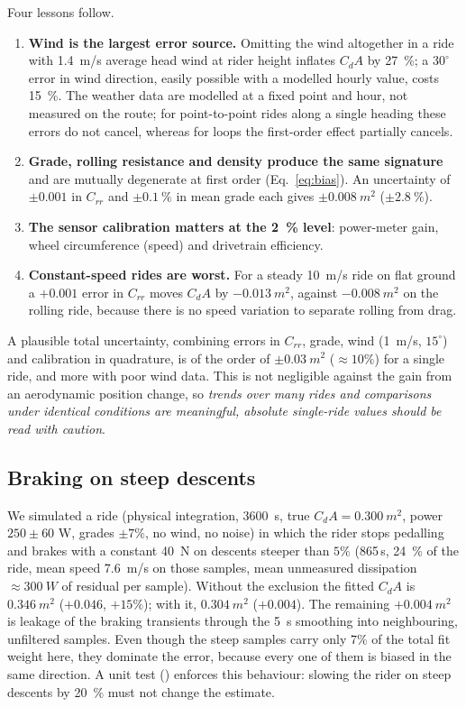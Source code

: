 \documentclass[11pt,a4paper]{article}
\newcommand{\code}[1]{\texttt{\detokenize{#1}}}
\newcommand{\CdA}{C_{\!d}A}
\begin{document}
Four lessons follow.
\begin{enumerate}
 \item \textbf{Wind is the largest error source.} Omitting the wind altogether in a ride with \SI{1.4}{m/s} average head wind at rider height inflates \(\CdA\) by \SI{27}{\percent}; a \(30^\circ\) error in wind direction, easily possible with a modelled hourly value, costs \SI{15}{\percent}. The weather data are modelled at a fixed point and hour, not measured on the route; for point-to-point rides along a single heading these errors do not cancel, whereas for loops the first-order effect partially cancels.
 \item \textbf{Grade, rolling resistance and density produce the same signature} and are mutually degenerate at first order (Eq.~\eqref{eq:bias}). An uncertainty of \(\pm0.001\) in \(C_{rr}\) and \(\pm\SI{0.1}{\percent}\) in mean grade each gives \(\pm0.008\ \si{m^2}\) (\(\pm\SI{2.8}{\percent}\)).
 \item \textbf{The sensor calibration matters at the \SI{2}{\percent} level}: power-meter gain, wheel circumference (speed) and drivetrain efficiency.
 \item \textbf{Constant-speed rides are worst.} For a steady \SI{10}{m/s} ride on flat ground a \(+0.001\) error in \(C_{rr}\) moves \(\CdA\) by \(-0.013\ \si{m^2}\), against \(-0.008\ \si{m^2}\) on the rolling ride, because there is no speed variation to separate rolling from drag.
\end{enumerate}
A plausible total uncertainty, combining errors in \(C_{rr}\), grade, wind (\SI{1}{m/s}, \(15^\circ\)) and calibration in quadrature, is of the order of \(\pm0.03\ \si{m^2}\) (\(\approx10\%\)) for a single ride, and more with poor wind data. This is not negligible against the gain from an aerodynamic position change, so \emph{trends over many rides and comparisons under identical conditions are meaningful, absolute single-ride values should be read with caution}.

\subsection{Braking on steep descents}
\label{sec:braking}
We simulated a ride (physical integration, \SI{3600}{s}, true \(\CdA=\SI{0.300}{m^2}\), power \(250\pm60\) W, grades \(\pm7\%\), no wind, no noise) in which the rider stops pedalling and brakes with a constant \SI{40}{N} on descents steeper than \(5\%\) (865\,s, \SI{24}{\percent} of the ride, mean speed \SI{7.6}{m/s} on those samples, mean unmeasured dissipation \(\approx\SI{300}{W}\) of residual per sample). Without the exclusion the fitted \(\CdA\) is \(0.346\ \si{m^2}\) (\(+0.046\), \(+15\%\)); with it, \(0.304\ \si{m^2}\) (\(+0.004\)). The remaining \(+0.004\ \si{m^2}\) is leakage of the braking transients through the \SI{5}{s} smoothing into neighbouring, unfiltered samples. Even though the steep samples carry only \(7\%\) of the total fit weight here, they dominate the error, because every one of them is biased in the same direction. A unit test (\code{test_braking_on_descents_is_not_booked_as_drag}) enforces this behaviour: slowing the rider on steep descents by \SI{20}{\percent} must not change the estimate.
\end{document}
